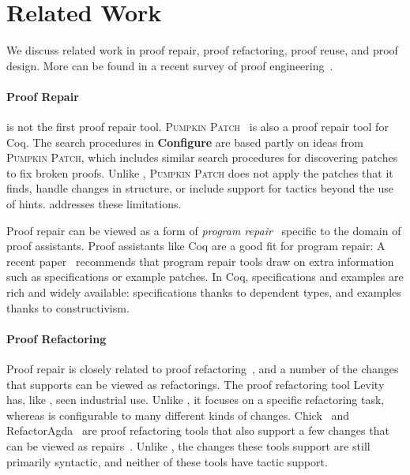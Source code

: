\section{Related Work}
\label{sec:related}


We discuss related work in proof repair, proof refactoring, proof reuse, and proof design.
More can be found in a recent survey of proof engineering~\cite{PGL-045}.

\paragraph{Proof Repair}

\toolname is not the first proof repair tool.
\textsc{Pumpkin Patch}~\cite{pumpkinpatch} is also a proof repair tool for Coq.
The search procedures in \textbf{Configure} are based partly on ideas from \textsc{Pumpkin Patch}, which includes
similar search procedures for discovering patches to fix broken proofs.
Unlike \toolname, \textsc{Pumpkin Patch} does not apply the patches that it finds,
handle changes in structure, or include support for tactics beyond the use of hints.
\toolname addresses these limitations.

Proof repair can be viewed as a form of \textit{program repair}~\cite{Monperrus:2018:ASR:3177787.3105906, Gazzola:2018:ASR:3180155.3182526}
specific to the domain of proof assistants.
Proof assistants like Coq are a good fit for program repair: A recent paper~\cite{Qi:2015:APP:2771783.2771791} 
recommends that program repair tools draw on extra information
such as specifications or example patches. In Coq, specifications and examples 
are rich and widely available: specifications thanks to dependent types,
and examples thanks to constructivism.

\paragraph{Proof Refactoring}

Proof repair is closely related to proof refactoring~\cite{WhitesidePhD}, and a number of the changes
that \toolname supports can be viewed as refactorings.
The proof refactoring tool Levity~\cite{Bourke12} has, like \toolname, seen industrial use.
Unlike \toolname, it focuses on a specific refactoring task, whereas \toolname is configurable to many different kinds of changes.
Chick~\cite{robert2018} and RefactorAgda~\cite{wibergh2019} are proof refactoring tools that
also support a few changes that can be viewed as repairs~\cite{PGL-045}.
Unlike \toolname, the changes these tools support are still primarily syntactic,
and neither of these tools have tactic support.


